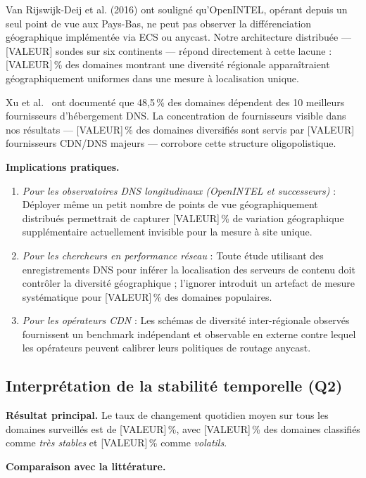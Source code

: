 Van Rijswijk-Deij et al. (2016) ont souligné qu'OpenINTEL, opérant depuis un seul point de vue aux Pays-Bas, ne peut pas observer la différenciation géographique implémentée via ECS ou anycast. Notre architecture distribuée --- [VALEUR] sondes sur six continents --- répond directement à cette lacune : [VALEUR]\,\% des domaines montrant une diversité régionale apparaîtraient géographiquement uniformes dans une mesure à localisation unique.

Xu et al.~\cite{Xu2023} ont documenté que 48,5\,\% des domaines dépendent des 10 meilleurs fournisseurs d'hébergement DNS. La concentration de fournisseurs visible dans nos résultats --- [VALEUR]\,\% des domaines diversifiés sont servis par [VALEUR] fournisseurs CDN/DNS majeurs --- corrobore cette structure oligopolistique.

\textbf{Implications pratiques.}

\begin{enumerate}
  \item \textit{Pour les observatoires DNS longitudinaux (OpenINTEL et successeurs)} : Déployer même un petit nombre de points de vue géographiquement distribués permettrait de capturer [VALEUR]\,\% de variation géographique supplémentaire actuellement invisible pour la mesure à site unique.
  \item \textit{Pour les chercheurs en performance réseau} : Toute étude utilisant des enregistrements DNS pour inférer la localisation des serveurs de contenu doit contrôler la diversité géographique ; l'ignorer introduit un artefact de mesure systématique pour [VALEUR]\,\% des domaines populaires.
  \item \textit{Pour les opérateurs CDN} : Les schémas de diversité inter-régionale observés fournissent un benchmark indépendant et observable en externe contre lequel les opérateurs peuvent calibrer leurs politiques de routage anycast.
\end{enumerate}
\bigskip
\subsection{Interprétation de la stabilité temporelle (Q2)}
\label{subsec:5.1.2}

\textbf{Résultat principal.} Le taux de changement quotidien moyen sur tous les domaines surveillés est de [VALEUR]\,\%, avec [VALEUR]\,\% des domaines classifiés comme \textit{très stables} et [VALEUR]\,\% comme \textit{volatils}.

\textbf{Comparaison avec la littérature.}

